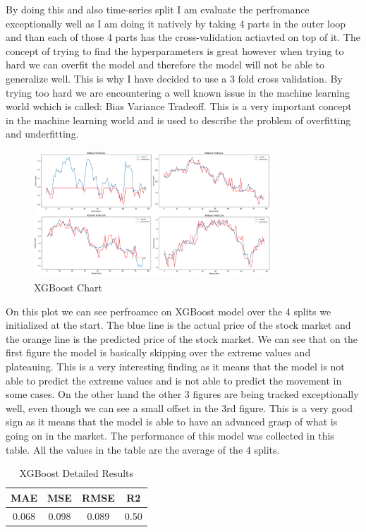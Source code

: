 \documentclass{imc-inf}
\begin{document}
			By doing this and also time-series split I am evaluate the perfromance exceptionally well as I am doing it natively by taking 4 parts in the outer loop and than each of those 4 parts has the cross-validation actiavted on top of it.
			The concept of trying to find the hyperparameters is great however when trying to hard we can overfit the model and therefore the model will not be able to generalize well. This is why I have decided to use a 3 fold cross validation.
			By trying too hard we are encountering a well known issue in the machine learning world wchich is called: Bias Variance Tradeoff. This is a very important concept in the machine learning world and is used to describe the problem of overfitting
			and underfitting. 
			\begin{figure}[h]
				\centering
				\includegraphics[width=0.8\textwidth]{xgboost_chart.png}
				\caption{XGBoost Chart}
				\label{fig:xgboost_chart}
			\end{figure}
			On this plot we can see perfroamce on XGBoost model over the 4 splits we initialized at the start. The blue line is the actual price of the stock market and the orange line is the predicted price of the stock market.
			We can see that on the first figure the model is basically skipping over the extreme values and plateauing. This is a very interesting finding as it means that the model is not able to predict the extreme values and is not able to predict the 
			movement in some cases. On the other hand the other 3 figures are being tracked exceptionally well, even though we can see a small offset in the 3rd figure. This is a very good sign as it means that the model is able to have an 
			advanced grasp of what is going on in the market. The performance of this model was collected in this table. All the values in the table are the average of the 4 splits.
			\begin{table}[h]
				\centering
				\begin{tabular}{|c|c|c|c|}
					\hline
					\textbf{MAE} & \textbf{MSE} & \textbf{RMSE} & \textbf{R2} \\ \hline
					0.068 & 0.098 & 0.089 & 0.50 \\ \hline
				\end{tabular}
				\caption{XGBoost Detailed Results}
				\label{tab:xgboost_detailed_results}
			\end{table}
\end{document}
